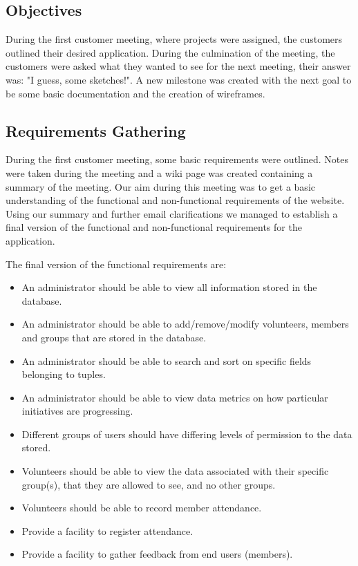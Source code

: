 \documentclass{l3proj}
\begin{document}
\subsection{Objectives}
\label{sec:objectives}

During the first customer meeting, where projects were assigned, the customers outlined their desired application. During the culmination of the meeting, the customers were asked what they wanted to see for the next meeting, their answer was: "I guess, some sketches!". A new milestone was created with the next goal to be some basic documentation and the creation of wireframes.

\subsection{Requirements Gathering}
\label{requirements}

During the first customer meeting, some basic requirements were outlined. Notes were taken during the meeting and a wiki page was created containing a summary of the meeting. Our aim during this meeting was to get a basic understanding of the functional and non-functional requirements of the website. Using our summary and further email clarifications we managed to establish a final version of the functional and non-functional requirements for the application.

The final version of the functional requirements are:
\begin{itemize}
\item An administrator should be able to view all information stored in the database.
\item An administrator should be able to add/remove/modify volunteers, members and groups that are stored in the database.
\item An administrator should be able to search and sort on specific fields belonging to tuples.
\item An administrator should be able to view data metrics on how particular initiatives are progressing.
\item Different groups of users should have differing levels of permission to the data stored.
\item Volunteers should be able to view the data associated with their specific group(s), that they are allowed to see, and no other groups.
\item Volunteers should be able to record member attendance.
\item Provide a facility to register attendance.
\item Provide a facility to gather feedback from end users (members).
\end{itemize}
\end{document}
